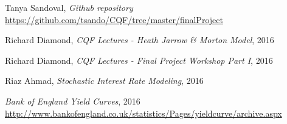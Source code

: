 \documentclass[reqno]{article}
\begin{document}

\newpage


  \begin{thebibliography}{1}

  Tanya Sandoval, {\em Github repository}  \url{https://github.com/tsando/CQF/tree/master/finalProject}

   Richard Diamond, {\em CQF Lectures - Heath Jarrow \& Morton Model},  2016
  
     Richard Diamond, {\em CQF Lectures - Final Project Workshop Part I},  2016
    
    Riaz Ahmad, {\em Stochastic Interest Rate Modeling},  2016
   
    {\em Bank of England Yield Curves},  2016 \url{http://www.bankofengland.co.uk/statistics/Pages/yieldcurve/archive.aspx}
   
%
%
%

  \end{thebibliography}
\end{document}
